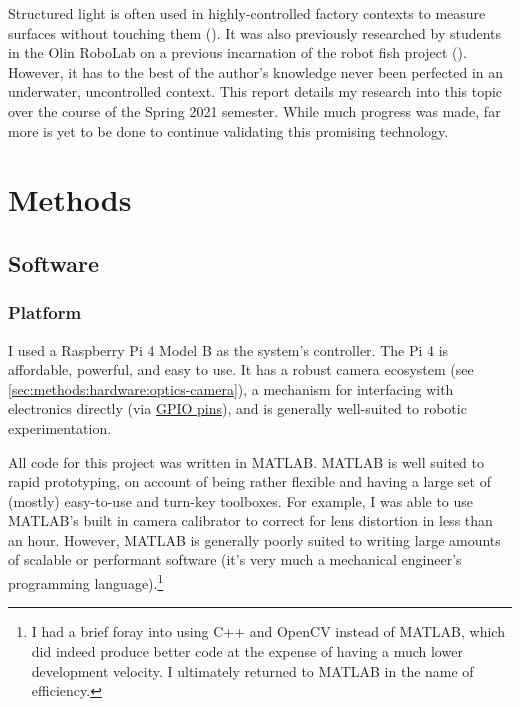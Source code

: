 \documentclass{article}
\begin{document}
Structured light is often used in highly-controlled factory contexts to measure surfaces without touching them (\cite{salvi_state_2010, tsai_development_2005}). It was also previously researched by students in the Olin RoboLab on a previous incarnation of the robot fish project (\cite{barrett_applying_2018}). However, it has to the best of the author's knowledge never been perfected in an underwater, uncontrolled context. This report details my research into this topic over the course of the Spring 2021 semester. While much progress was made, far more is yet to be done to continue validating this promising technology.

\section{Methods} \label{sec:methods}

\subsection{Software} \label{sec:methods:software}

\subsubsection{Platform} \label{sec:methods:software:platform}

I used a Raspberry Pi 4 Model B as the system's controller. The Pi 4 is affordable, powerful, and easy to use. It has a robust camera ecosystem (see \ref{sec:methods:hardware:optics-camera}), a mechanism for interfacing with electronics directly (via \href{https://www.raspberrypi.org/documentation/usage/gpio/}{GPIO pins}), and is generally well-suited to robotic experimentation.

All code for this project was written in MATLAB. MATLAB is well suited to rapid prototyping, on account of being rather flexible and having a large set of (mostly) easy-to-use and turn-key toolboxes. For example, I was able to use MATLAB's built in camera calibrator to correct for lens distortion in less than an hour. However, MATLAB is generally poorly suited to writing large amounts of scalable or performant software (it's very much a mechanical engineer's programming language).\footnote{I had a brief foray into using C++ and OpenCV instead of MATLAB, which did indeed produce better code at the expense of having a much lower development velocity. I ultimately returned to MATLAB in the name of efficiency.}
\end{document}
